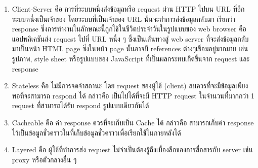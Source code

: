 \begin{enumerate}
    \item Client-Server คือ การที่ระบบหนึ่งส่งข้อมูลหรือ request ผ่าน HTTP ไปบน URL ที่อีกระบบหนึ่งเป็นเจ้าของ โดยระบบที่เป็นเจ้าของ URL นั้นจะทําการส่งข้อมูลกลับมา เรียกว่า response ซึ่งการทํางานในลักษณะนี้ถูกใช้ในชีวิตประจําวันในรูปแบบของ web browser คือแอปพลิเคชันส่ง request ไปที่ URL หนึ่ง ๆ ซึ่งเป็นเส้นทางสู่ web server ที่จะส่งข้อมูลกลับมาเป็นหน้า HTML page ซึ่งในหน้า page นั้นอาจมี references ต่างๆเชื่อมอยู่มากมาย เช่น รูปภาพ, style sheet หรือรูปแบบของ JavaScript ที่เป็นผลกระทบเกิดขึ้นจาก request และ response

    \item Stateless คือ ไม่มีการจดจําสถานะ โดย request ของผู้ใช้ (client) สมควรที่จะมีข้อมูลเพียงพอที่จะสามารถ respond ได้ กล่าวคือ เป็นไปได้ที่จะมี HTTP request ในจํานวนที่มากกว่า 1 request ที่สามารถได้รับ respond รูปแบบเดียวกันได้
    \item Cacheable คือ ค่า response ควรที่จะเก็บเป็น Cache ได้ กล่าวคือ สามารถเก็บค่า response ไว้เป็นข้อมูลชั่วคราวในที่เก็บข้อมูลชั่วคราวเพื่อเรียกใช้ในภายหลังได้
    \item Layered คือ ผู้ใช้ที่ทําการส่ง request ไม่จําเป็นต้องรู้ถึงเบื้องลึกของการสื่อสารกับ server เช่น proxy หรือตัวกลางอื่น ๆ

\end{enumerate}

